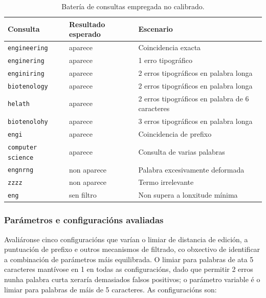 \documentclass[%
    a4paper,               %
    twoside,               %
    10pt,                  %
]{article}                 %
\begin{document}
\begin{table}[t]
    \centering
    \begin{tabular}{lll}
        \hline
        \textbf{Consulta}         & \textbf{Resultado esperado} & \textbf{Escenario}                              \\
        \hline
        \texttt{engineering}      & aparece                     & Coincidencia exacta                             \\
        \texttt{enginering}       & aparece                     & 1 erro tipográfico                              \\
        \texttt{enginiring}       & aparece                     & 2 erros tipográficos en palabra longa           \\
        \texttt{biotenology}      & aparece                     & 2 erros tipográficos en palabra longa           \\
        \texttt{helath}           & aparece                     & 2 erros tipográficos en palabra de 6 caracteres \\
        \texttt{biotenolohy}      & aparece                     & 3 erros tipográficos en palabra longa           \\
        \texttt{engi}             & aparece                     & Coincidencia de prefixo                         \\
        \texttt{computer science} & aparece                     & Consulta de varias palabras                     \\
        \texttt{engnrng}          & non aparece                 & Palabra excesivamente deformada                 \\
        \texttt{zzzz}             & non aparece                 & Termo irrelevante                               \\
        \texttt{eng}              & sen filtro                  & Non supera a lonxitude mínima                   \\
        \hline
    \end{tabular}
    \caption{Batería de consultas empregada no calibrado.}
    \label{tab:bateria}
\end{table}

\subsubsection{Parámetros e configuracións avaliadas}

Avaliáronse cinco configuracións que varían o limiar de distancia de edición, a puntuación de prefixo e outros mecanismos de filtrado, co obxectivo de identificar a combinación de parámetros máis equilibrada. O limiar para palabras de ata 5 caracteres mantívose en 1 en todas as configuracións, dado que permitir 2 erros nunha palabra curta xeraría demasiados falsos positivos; o parámetro variable é o limiar para palabras de máis de 5 caracteres. As configuracións son:
\end{document}

